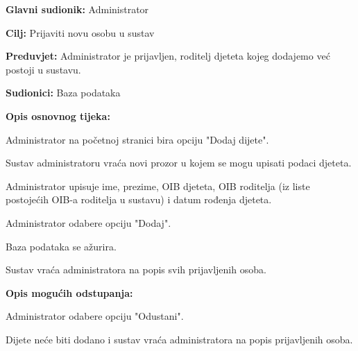 					\noindent {}
					\begin{packed_item}
						
						\item \textbf{Glavni sudionik: }Administrator
						\item  \textbf{Cilj:} Prijaviti novu osobu u sustav
						\item  \textbf{Preduvjet:} Administrator je prijavljen, roditelj djeteta kojeg dodajemo već postoji u sustavu.
						\item  \textbf{Sudionici:} Baza podataka
						\item  \textbf{Opis osnovnog tijeka:}
						
						\item[] \begin{packed_enum}
							
							\item Administrator na početnoj stranici bira opciju "Dodaj dijete".
							\item Sustav administratoru vraća novi prozor u kojem se mogu upisati podaci djeteta.
							\item Administrator upisuje ime, prezime, OIB djeteta, OIB roditelja (iz liste postojećih OIB-a roditelja u sustavu) i datum rođenja djeteta.
							\item Administrator odabere opciju "Dodaj".
							\item Baza podataka se ažurira.
							\item Sustav vraća administratora na popis svih prijavljenih osoba.
						\end{packed_enum}
						
						\item  \textbf{Opis mogućih odstupanja:}
						
						\item[] \begin{packed_item}
							
							
							\item[4.a] Administrator odabere opciju "Odustani".
							\item[] \begin{packed_enum}
								
								\item Dijete neće biti dodano i sustav vraća administratora na popis prijavljenih osoba.
							\end{packed_enum}
							
							
						\end{packed_item}
						
						
					\end{packed_item}
					
